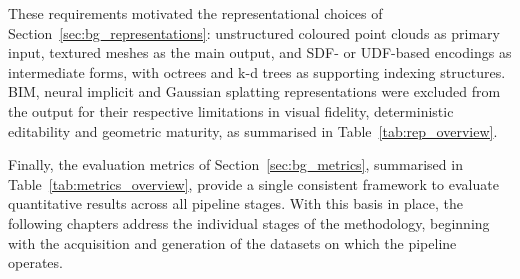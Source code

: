 These requirements motivated the representational choices of Section~\ref{sec:bg_representations}: unstructured coloured point clouds as primary input, textured meshes as the main output, and \gls{SDF}- or \gls{UDF}-based encodings as intermediate forms, with octrees and k-d trees as supporting indexing structures. \gls{BIM}, neural implicit and Gaussian splatting representations were excluded from the output for their respective limitations in visual fidelity, deterministic editability and geometric maturity, as summarised in Table~\ref{tab:rep_overview}.

Finally, the evaluation metrics of Section~\ref{sec:bg_metrics}, summarised in Table~\ref{tab:metrics_overview}, provide a single consistent framework to evaluate quantitative results across all pipeline stages. With this basis in place, the following chapters address the individual stages of the methodology,
 beginning with the acquisition and generation of the datasets on which the pipeline operates.

\cleardoublepage
\cleardoublepage